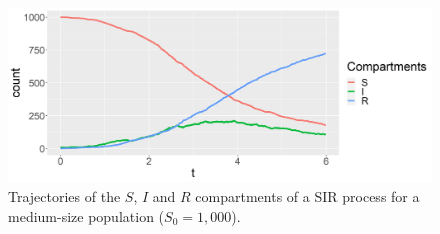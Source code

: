 \documentclass[11pt]{article}
\begin{document}
	
	
	\begin{figure}
		\centering
		\includegraphics[scale = 0.3]{E1_trajectories}
		\caption{Trajectories of the $S$, $I$ and $R$ compartments of a SIR process for a medium-size population ($S_0 = 1,000$).}
		\label{fig:long}
	\end{figure}
	
\end{document}
